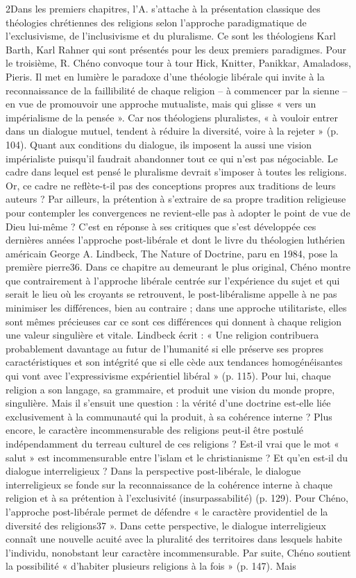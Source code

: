  
2Dans les premiers chapitres, l’A. s’attache à la présentation classique des théologies chrétiennes des religions selon l’approche paradigmatique de l’exclusivisme, de l’inclusivisme et du pluralisme. Ce sont les théologiens Karl Barth, Karl Rahner qui sont présentés pour les deux premiers paradigmes. Pour le troisième, R. Chéno convoque tour à tour Hick, Knitter, Panikkar, Amaladoss, Pieris. Il met en lumière le paradoxe d’une théologie libérale qui invite à la reconnaissance de la faillibilité de chaque religion – à commencer par la sienne – en vue de promouvoir une approche mutualiste, mais qui glisse « vers un impérialisme de la pensée ». Car nos théologiens pluralistes, « à vouloir entrer dans un dialogue mutuel, tendent à réduire la diversité, voire à la rejeter » (p. 104). Quant aux conditions du dialogue, ils imposent la aussi une vision impérialiste puisqu’il faudrait abandonner tout ce qui n’est pas négociable. Le cadre dans lequel est pensé le pluralisme devrait s’imposer à toutes les religions. Or, ce cadre ne reflète-t-il pas des conceptions propres aux traditions de leurs auteurs ? Par ailleurs, la prétention à s’extraire de sa propre tradition religieuse pour contempler les convergences ne revient-elle pas à adopter le point de vue de Dieu lui-même ? C’est en réponse à ses critiques que s’est développée ces dernières années l’approche post-libérale et dont le livre du théologien luthérien américain George A. Lindbeck, The Nature of Doctrine, paru en 1984, pose la première pierre36. Dans ce chapitre au demeurant le plus original, Chéno montre que contrairement à l’approche libérale centrée sur l’expérience du sujet et qui serait le lieu où les croyants se retrouvent, le post-libéralisme appelle à ne pas minimiser les différences, bien au contraire ; dans une approche utilitariste, elles sont mêmes précieuses car ce sont ces différences qui donnent à chaque religion une valeur singulière et vitale. Lindbeck écrit : « Une religion contribuera probablement davantage au futur de l’humanité si elle préserve ses propres caractéristiques et son intégrité que si elle cède aux tendances homogénéisantes qui vont avec l’expressivisme expérientiel libéral » (p. 115). Pour lui, chaque religion a son langage, sa grammaire, et produit une vision du monde propre, singulière. Mais il s’ensuit une question : la vérité d’une doctrine est-elle liée exclusivement à la communauté qui la produit, à sa cohérence interne ? Plus encore, le caractère incommensurable des religions peut-il être postulé indépendamment du terreau culturel de ces religions ? Est-il vrai que le mot « salut » est incommensurable entre l’islam et le christianisme ? Et qu’en est-il du dialogue interreligieux ? Dans la perspective post-libérale, le dialogue interreligieux se fonde sur la reconnaissance de la cohérence interne à chaque religion et à sa prétention à l’exclusivité (insurpassabilité) (p. 129). Pour Chéno, l’approche post-libérale permet de défendre « le caractère providentiel de la diversité des religions37 ». Dans cette perspective, le dialogue interreligieux connaît une nouvelle acuité avec la pluralité des territoires dans lesquels habite l’individu, nonobstant leur caractère incommensurable. Par suite, Chéno soutient la possibilité « d’habiter plusieurs religions à la fois » (p. 147). Mais 